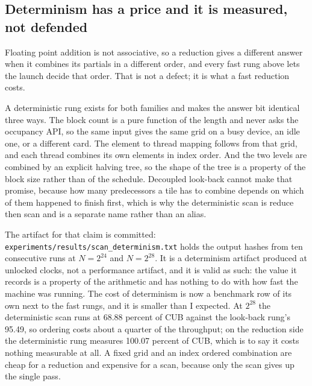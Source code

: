 \subsection{Determinism has a price and it is measured, not defended}

Floating point addition is not associative, so a reduction gives a different answer
when it combines its partials in a different order, and every fast rung above lets
the launch decide that order. That is not a defect; it is what a fast reduction
costs.

A deterministic rung exists for both families and makes the answer bit identical
three ways. The block count is a pure function of the length and never asks the
occupancy API, so the same input gives the same grid on a busy device, an idle one,
or a different card. The element to thread mapping follows from that grid, and each
thread combines its own elements in index order. And the two levels are combined by
an explicit halving tree, so the shape of the tree is a property of the block size
rather than of the schedule. Decoupled look-back cannot make that promise, because
how many predecessors a tile has to combine depends on which of them happened to
finish first, which is why the deterministic scan is reduce then scan and is a
separate name rather than an alias.

The artifact for that claim is committed:
\texttt{experiments/results/scan\_determinism.txt} holds the output hashes from ten
consecutive runs at $N = 2^{24}$ and $N = 2^{28}$. It is a determinism artifact
produced at unlocked clocks, not a performance artifact, and it is valid as such:
the value it records is a property of the arithmetic and has nothing to do with how
fast the machine was running. The cost of determinism is now a benchmark row of its
own next to the fast rungs, and it is smaller than I expected. At $2^{28}$ the
deterministic scan runs at 68.88 percent of CUB against the look-back rung's 95.49,
so ordering costs about a quarter of the throughput; on the reduction side the
deterministic rung measures 100.07 percent of CUB, which is to say it costs nothing
measurable at all. A fixed grid and an index ordered combination are cheap for a
reduction and expensive for a scan, because only the scan gives up the single pass.

\begin{table}[htbp]
\centering

\caption{The reduction and scan ladders, measured at locked clocks. Bytes moved per
element is derived from the decomposition. The throughput column is effective GB/s
rather than GFLOP/s: these kernels do a fixed two or three FLOP per element and the
quantity that means anything for them, and that the gate is stated in, is bytes
moved per second.}
\label{tab:scan}
\end{table}

